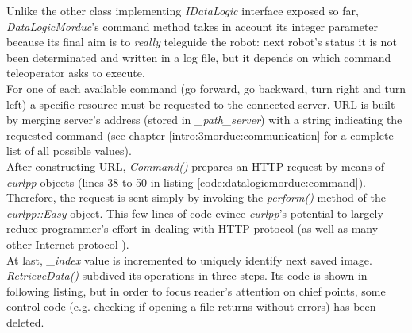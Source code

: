 Unlike the other class implementing \textit{IDataLogic} interface
exposed so far, \textit{DataLogicMorduc}'s command method takes
in account its integer parameter because its final aim is to
\textit{really} teleguide the robot: next robot's status it is
not been determinated and written in a log file, but it depends
on which command teleoperator asks to execute.
\\
For one of each available command (go forward, go backward, turn right
and turn left) a specific resource must be requested to the connected
\morduc{} server. URL is built by merging server's address (stored
in \textit{\_path\_server}) with a string indicating the requested
command (see chapter \ref{intro:3morduc:communication} for a complete
list of all possible values).
\\
After constructing URL, \textit{Command()} prepares an HTTP
request by means of \textit{curlpp} objects (lines 38 to 50 in listing
\ref{code:datalogicmorduc:command}). Therefore, the request is sent
simply by invoking the \textit{perform()} method of the
\textit{curlpp::Easy} object. This few lines of code evince
\textit{curlpp}'s potential to largely reduce programmer's effort in
dealing with HTTP protocol (as well as many other Internet protocol
\cite{library:curlpp}).
\\
At last, \textit{\_index} value is incremented to uniquely identify
next saved image.
\\
\textit{RetrieveData()} subdived its operations in three steps. Its
code is shown in following listing, but in order to
focus reader's attention on chief points, some control code (e.g. checking
if opening a file returns without errors) has been deleted.
\\
